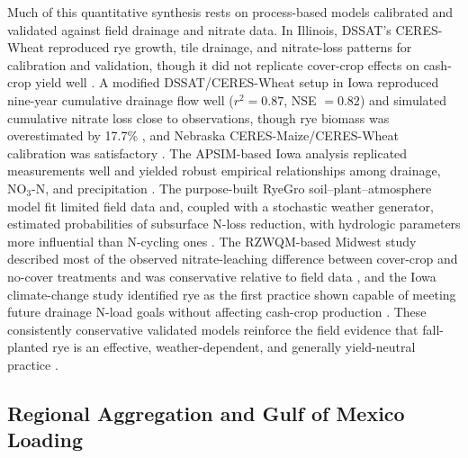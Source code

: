 Much of this quantitative synthesis rests on process-based models calibrated and validated against field drainage and nitrate data. In Illinois, DSSAT's CERES-Wheat reproduced rye growth, tile drainage, and nitrate-loss patterns for calibration and validation, though it did not replicate cover-crop effects on cash-crop yield well \parencite{Gupta2022}. A modified DSSAT/CERES-Wheat setup in Iowa reproduced nine-year cumulative drainage flow well ($r^2=0.87$, NSE $=0.82$) and simulated cumulative nitrate loss close to observations, though rye biomass was overestimated by 17.7\% \parencite{Chatterjee2025}, and Nebraska CERES-Maize/CERES-Wheat calibration was satisfactory \parencite{Birru2023}. The APSIM-based Iowa analysis replicated measurements well and yielded robust empirical relationships among drainage, NO$_3$-N, and precipitation \parencite{MartinezFeria2016}. The purpose-built RyeGro soil--plant--atmosphere model fit limited field data and, coupled with a stochastic weather generator, estimated probabilities of subsurface N-loss reduction, with hydrologic parameters more influential than N-cycling ones \parencite{Feyereisen2006b}. The RZWQM-based Midwest study described most of the observed nitrate-leaching difference between cover-crop and no-cover treatments and was conservative relative to field data \parencite{Malone2014b}, and the Iowa climate-change study identified rye as the first practice shown capable of meeting future drainage N-load goals without affecting cash-crop production \parencite{Malone2020}. These consistently conservative validated models reinforce the field evidence that fall-planted rye is an effective, weather-dependent, and generally yield-neutral practice \parencite{Malone2014b,Malone2018,Chatterjee2025,MartinezFeria2016,Yang2021,Gupta2023b}.

\subsection{Regional Aggregation and Gulf of Mexico Loading}

